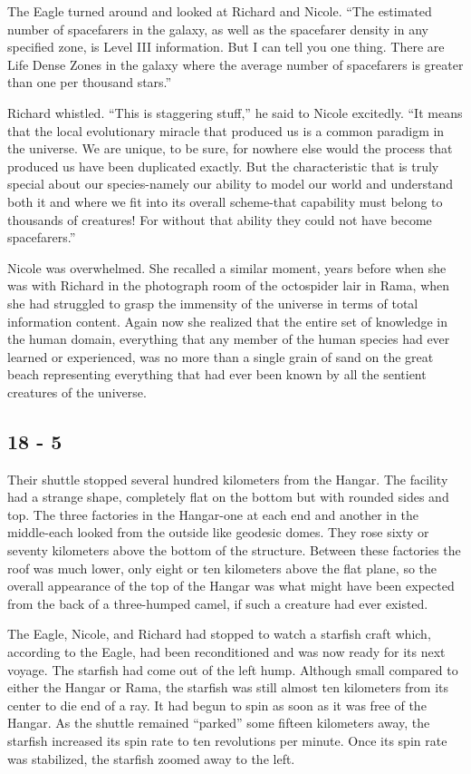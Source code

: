 \documentclass[]{article}
\begin{document}
{The Eagle turned around and looked at Richard and Nicole.  “The estimated number of spacefarers in the galaxy, as well as the spacefarer density in any specified zone, is Level III information.  But I can tell you one thing.  There are Life Dense Zones in the galaxy where the average number of spacefarers is greater than one per thousand stars.”

Richard whistled.  “This is staggering stuff,” he said to Nicole excitedly.  “It means that the local evolutionary miracle that produced us is a common paradigm in the universe.  We are unique, to be sure, for nowhere else would the process that produced us have been duplicated exactly.  But the characteristic that is truly special about our species-namely our ability to model our world and understand both it and where we fit into its overall scheme-that capability must belong to thousands of creatures! For without that ability they could not have become spacefarers.”

Nicole was overwhelmed.  She recalled a similar moment, years before when she was with Richard in the photograph room of the octospider lair in Rama, when she had struggled to grasp the immensity of the universe in terms of total information content.  Again now she realized that the entire set of knowledge in the human domain, everything that any member of the human species had ever learned or experienced, was no more than a single grain of sand on the great beach representing everything that had ever been known by all the sentient creatures of the universe.

\subsection*{18 - 5}

Their shuttle stopped several hundred kilometers from the Hangar.  The facility had a strange shape, completely flat on the bottom but with rounded sides and top.  The three factories in the Hangar-one at each end and another in the middle-each looked from the outside like geodesic domes.  They rose sixty or seventy kilometers above the bottom of the structure.  Between these factories the roof was much lower, only eight or ten kilometers above the flat plane, so the overall appearance of the top of the Hangar was what might have been expected from the back of a three-humped camel, if such a creature had ever existed.

The Eagle, Nicole, and Richard had stopped to watch a starfish craft which, according to the Eagle, had been reconditioned and was now ready for its next voyage.  The starfish had come out of the left hump.  Although small compared to either the Hangar or Rama, the starfish was still almost ten kilometers from its center to die end of a ray.  It had begun to spin as soon as it was free of the Hangar.  As the shuttle remained “parked” some fifteen kilometers away, the starfish increased its spin rate to ten revolutions per minute.  Once its spin rate was stabilized, the starfish zoomed away to the left.

}
\end{document}
